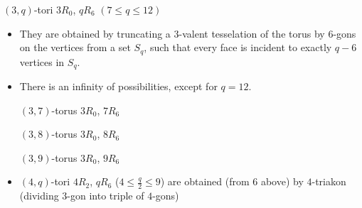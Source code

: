 \documentclass[%
pdf,
colorBG,
slideColor,
]{prosper}
\begin{document}
\begin{slide}{$(3,q)$-tori $3R_0$, $qR_6$ {\small $(7 \le q \le 12)$}}
\begin{itemize}
\item They are obtained by truncating 
a $3$-valent tesselation of the torus by $6$-gons on the vertices
from a set $S_q$,
such that every face is incident to exactly $q-6$ vertices in $S_q$.
\item There is an infinity of possibilities, except for $q=12$.
\begin{center}
\begin{minipage}{3.5cm}
\centering
{}\par
$(3,7)$-torus $3R_0$, $7R_6$
\end{minipage}
\begin{minipage}{3.5cm}
\centering
{}\par
$(3,8)$-torus $3R_0$, $8R_6$
\end{minipage}
\begin{minipage}{3.5cm}
\centering
{}\par
$(3,9)$-torus $3R_0$, $9R_6$
\end{minipage}
\end{center}
\item $(4,q)$-tori $4R_2$, $qR_6$ ($4 \le \frac{q}{2} \le 9$)
are obtained (from 6 above) by $4$-triakon (dividing $3$-gon into triple of $4$-gons)

\end{itemize}
\end{slide}
\end{document}
